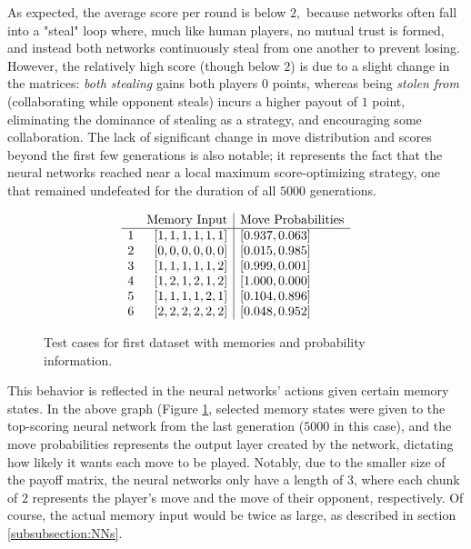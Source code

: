 \documentclass{article}
\begin{document}
As expected, the average score per round is below $2,$ because networks often fall into a "steal" loop where, much like human players, no mutual trust is formed, and instead both networks continuously steal from one another to prevent losing. However, the relatively high score (though below $2$) is due to a slight change in the matrices: \textit{both stealing} gains both players $0$ points, whereas being \textit{stolen from} (collaborating while opponent steals) incurs a higher payout of $1$ point, eliminating the dominance of stealing as a strategy, and encouraging some collaboration. The lack of significant change in move distribution and scores beyond the first few generations is also notable; it represents the fact that the neural networks reached near a local maximum score-optimizing strategy, one that remained undefeated for the duration of all $5000$ generations.

\begin{figure}[h]
  \caption{Test cases for first dataset with memories and probability information.}
	\label{fig:1607068848885-cases}
	\[\begin{array}{l r|l}
		&\text{Memory Input} & \text{Move Probabilities} \\
		\hline
		1&{[1, 1, 1, 1, 1, 1]} & {[0.937, 0.063]} \\
		2&{[0, 0, 0, 0, 0, 0]} & {[0.015, 0.985]} \\
		3&{[1, 1, 1, 1, 1, 2]} & {[0.999, 0.001]} \\
		4&{[1, 2, 1, 2, 1, 2]} & {[1.000, 0.000]} \\
		5&{[1, 1, 1, 1, 2, 1]} & {[0.104, 0.896]} \\
		6&{[2, 2, 2, 2, 2, 2]} & {[0.048, 0.952]} \\
	\end{array}\]
\end{figure}

This behavior is reflected in the neural networks' actions given certain memory states. In the above graph (Figure \ref{fig:1607068848885-cases}, selected memory states were given to the top-scoring neural network from the last generation ($5000$ in this case), and the move probabilities represents the output layer created by the network, dictating how  likely it wants each move to be played. Notably, due to the smaller size of the payoff matrix, the neural networks only have a length of $3$, where each chunk of $2$ represents the player's move and the move of their opponent, respectively. Of course, the actual memory input would be twice as large, as described in section \ref{subsubsection:NNs}.
\end{document}
